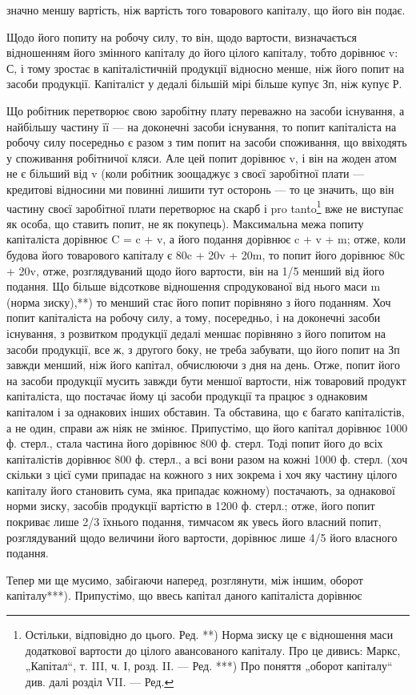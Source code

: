 \parcont{}  %
значно меншу вартість, ніж вартість того товарового капіталу, що
його він подає.

Щодо його попиту на робочу силу, то він, щодо вартости, визначається
відношенням його змінного капіталу до його цілого капіталу,
тобто дорівнює v: С, і тому зростає в капіталістичній продукції
відносно менше, ніж його попит на засоби продукції. Капіталіст
у дедалі більшій мірі більше купує Зп, ніж купує Р.

Що робітник перетворює свою заробітну плату переважно на засоби
існування, а найбільшу частину її — на доконечні засоби існування, то попит
капіталіста на робочу силу посередньо є разом з тим попит на засоби споживання,
що ввіходять у споживання робітничої кляси. Але цей попит
дорівнює v, і він на жоден атом не є більший від v (коли робітник зоощаджує
з своєї заробітної плати — кредитові відносини ми повинні лишити
тут осторонь — то це значить, що він частину своєї заробітної плати
перетворює на скарб і pro tanto\footnote*{
Остільки, відповідно до цього. Ред.
**) Норма зиску це є відношення маси додаткової вартости до цілого авансованого
капіталу. Про це дивись: Маркс, „Капітал“, т. III, ч. І, розд. II. —
Ред.
***) Про поняття „оборот капіталу“ див. далі розділ VII. — Ред.
} вже не виступає як особа, що ставить
попит, не як покупець). Максимальна межа попиту капіталіста дорівнює
C = c + v, а його подання дорівнює c + v + m; отже, коли будова
його товарового капіталу є 80c + 20v + 20m, то попит його дорівнює
80с + 20v, отже, розглядуваний щодо його вартости, він на 1/5 менший
від його подання. Що більше відсоткове відношення спродукованої від нього
маси m (норма зиску),**) то менший стає його попит порівняно з його
поданням. Хоч попит капіталіста на робочу силу, а тому, посередньо, і
на доконечні засоби існування, з розвитком продукції дедалі меншає порівняно
з його попитом на засоби продукції, все ж, з другого боку, не
треба забувати, що його попит на Зп завжди менший, ніж його капітал,
обчислюючи з дня на день. Отже, попит його на засоби продукції
мусить завжди бути меншої вартости, ніж товаровий продукт капіталіста,
що постачає йому ці засоби продукції та працює з однаковим
капіталом і за однакових інших обставин. Та обставина, що є
багато капіталістів, а не один, справи аж ніяк не змінює. Припустімо,
що його капітал дорівнює 1000 ф. стерл., стала частина його дорівнює
800 ф. стерл. Тоді попит його до всіх капіталістів дорівнює 800 ф. стерл.,
а всі вони разом на кожні 1000 ф. стерл. (хоч скільки з цієї суми припадає
на кожного з них зокрема і хоч яку частину цілого капіталу його
становить сума, яка припадає кожному) постачають, за однакової норми
зиску, засобів продукції вартістю в 1200 ф. стерл.; отже, його попит покриває
лише 2/3 їхнього подання, тимчасом як увесь його власний попит,
розглядуваний щодо величини його вартости, дорівнює лише 4/5
його власного подання.

Тепер ми ще мусимо, забігаючи наперед, розглянути, між іншим, оборот
капіталу***). Припустімо, що ввесь капітал даного капіталіста дорівнює
\parbreak{}  %
